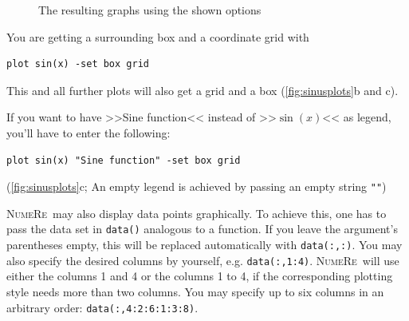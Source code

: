 \documentclass[DIV=14,headsepline,footsepline]{scrbook}
\newcommand{\NR}{\textsc{Nu\-me\-Re}}
\begin{document}
\begin{figure}[p]
					\caption{The resulting graphs using the shown options}
					\label{fig:sinusplots}
				\end{figure}
				
				You are getting a surrounding box and a coordinate grid with 
				\begin{lstlisting}
plot sin(x) -set box grid
				\end{lstlisting}
				This and all further plots will also get a grid and a box (\autoref{fig:sinusplots}b and c).
				
				If you want to have >>Sine function<< instead of >>$\sin(x)$<< as legend, you'll have to enter the following:
				\begin{lstlisting}
plot sin(x) "Sine function" -set box grid
				\end{lstlisting}
				(\autoref{fig:sinusplots}c; An empty legend is achieved by passing an empty string \lstinline+""+)
				
				\NR\ may also display data points graphically. To achieve this, one has to pass the data set in \lstinline+data()+ analogous to a function. If you leave the argument's parentheses empty, this will be replaced automatically with \lstinline+data(:,:)+. You may also specify the desired columns by yourself, e.g. \lstinline+data(:,1:4)+. \NR\ will use either the columns 1 and 4 or the columns 1 to 4, if the corresponding plotting style needs more than two columns. You may specify up to six columns in an arbitrary order: \lstinline+data(:,4:2:6:1:3:8)+.
				
\end{document}

